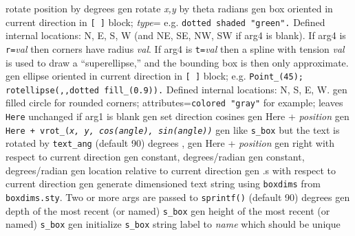   {rotate position by degrees}
  {gen}
  {rotate {\sl x,y} by theta radians}
  {gen}
  {box oriented in current direction in {\tt [ ]} block;
   {\sl type}= e.g. {\tt dotted shaded "green".}  Defined
   internal locations: N, E, S, W (and NE, SE, NW, SW if arg4 is blank).
   If arg4 is {\tt r=}{\sl val} then corners have radius {\sl val}.
   If arg4 is {\tt t=}{\sl val} then a spline with tension {\sl val}
   is used to draw a ``superellipse,'' and the bounding box is then
   only approximate. }
  {gen}
  {ellipse oriented in current direction in {\tt [ ]} block;
   e.g. {\tt Point\_(45); rotellipse(,{},dotted fill\_(0.9)).} Defined internal
   locations: N, S, E, W.}
  {gen}
  {filled circle for rounded corners; attributes={\tt colored "gray"} 
   for example; leaves {\tt Here} unchanged if arg1 is blank
    }
  {gen}
  {set direction cosines}
  {gen}
  {Here + {\sl position}}
  {gen}
  {\tt Here + vrot\_({\sl x, y, cos(angle), sin(angle))}}
  {gen}
  {like {\tt s\_box} but the text is rotated by {\tt text\_ang}
   (default 90) degrees , }
  {gen}
  {Here + {\sl position}}
  {gen}
  {right with respect to current direction}
  {gen}
  {constant, degrees/radian}
  {gen}
  {constant, degrees/radian}
  {gen}
  {location relative to current direction}
  {gen}
  {.s with respect to current direction}
  {gen}
  {generate dimensioned text string using {\tt{}boxdims} from
    {\tt boxdims.sty}. Two or more args are passed to {\tt sprintf()}
   (default 90) degrees }
  {gen}
  {depth of the most recent (or named) {\tt s\_box}
    }
  {gen}
  {height of the most recent (or named) {\tt s\_box}
    }
  {gen}
  {initialize {\tt s\_box} string label to {\sl name} which should be unique
    }

